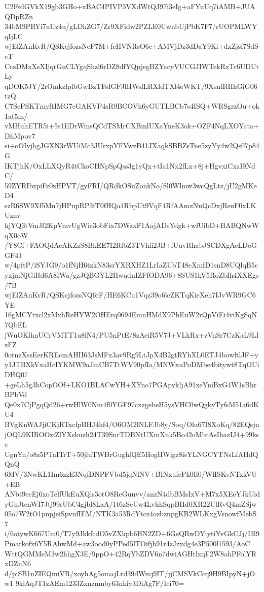 U2FsdGVkX19gb3GHo+xBAC4PIVP3VXdWtQJ97i3eIg+aFYuUq7iAMB+JUAQDpRZn
34bM9PRYi7uUz4u/gLDkZG7/Zr9XFidw2PZLE0UwnbUjPbK7F7/rUOPMLWYqIjLC
wjElZAnKvR/QSKcjfozsNeP7M+fcHVNRsO6c+AMVjDz3dDaY9Ki+dxZjsf7SdScT
CczDMxXsXIjqrGnCLYgqShzl6rDZ8dfYQpjegBZYacyVUCGJIWTekRxTr6UDUtLy
qDOK5JY/2rOmkzlplbGwBzTFsIGFJlHWslLRXldTXl4eWKT/9XsnfRHhGiG06tzQ
C7ScPSKTmyftIMG7cGAKVP4sR9BCOVh6yGUTLBCb7s4ISQ+WRSgrzOu+ok1at5m/
vMHuhETR5i+5s1EDrWmsQCdTSMrCXBmlUXaYneK3ok+OZF4NqLXOYata+DhMpov7
si+oOIyjhgJGXN3rWUiMc3JUrxpYFVwzB41JXaqkSBBZsTne5zyYy4w2Qs07p84G
IKTjhK/OxLLXQyR4tCkoCHNpSpQss3g1yQx+tIa1Nx2fLx+8j+HgvxiCxaI9NdC/
59ZYRIbzpiFz0zHPVT/gyFRI/QRdkOSuZonkNo/8l0Wlmw3wcQgLtz/jU2gMKeD4
szR6SW9Xf5Mn7jHPupRP3fT0fHQa4RbpUt9VqF4RfAAmzNuQcDxjRsuF0xLKUznv
hjYQ3tVmJf2KpVmvUgWic3obFix7DWzxF1AajADsYdgk+wfUibD+BABQNwWqX0oW
/Y8Cf+FAOQdAcAKZzS8BkEE7I2RlbZ3TVhii2JB+fUuvRhabJSCDXgAeLDoGGF4J
w/4pftP/iSYJG9/o1fNjH6tzkN83srYXRXHZ1LrIaZUbT48eXmfD1snD8UQlqB5c
yxjmNjGiRd6A8IWa/gzJQBGYL2HwudnIZFfODA96+8SUS1kV5RoZbIh4XXEgs/7B
wjElZAnKvR/QSKcjfozsNQ6rF/HE6KCu1Vqz39o6lcZKTqKieXeh7IJvWR9GC6YE
16gMCYtxcl2xMxhReHYW2OHErq0694EmnHMdX9PhEuW2rQpViEi4viKgSqN7QbEL
jWuOKlhnUCrVMTT1u8lN4/PU5nPtE/8zAeiR5V7J+VLkRx+zVnSr7CzKaL9LIzFZ
0otnzXssEerKREcmAHII63JsMFx3av9Rg9LtJpX4B2gtRYhXL0ETJ4bowltlJF+y
y1JTBXkVxaHcIYKMW9aJmCB7TtWV90pfIa/MNWxuPoDMbe4bitywt8TqOUiDHQ07
+geLh5g3hCopOOf+LKO1BLACwYH+XYno7PGApykljA91xeYniBxG4W1sBhrBPbVd
Qe0x7CjPgqQd26+rwHlW0Nm4f0YGF97cxzgebeH5ysVHC0wQgkyTyfsM51a6dKU4
BVgKnWAJjiCKjRTxcfpBHJ4hf4/O6OM2lNLFJb8y/Soq/Olu67I8XoKq/82EQsjn
jOQL9KIROOziZlYXskuzh24T39SnrTDBNtUXmXuk5Bo42oMbtAsIbazIJ4+99kse
UgnYn/o8z5PTaITrT+50jluTWBrGughlQE5HogHWigz8isYLNGCYTNsLfAHdQQnQ
6MV/3NwKL1Im6zzE3NqfDNPFVbd5jqNlNV+BINxufcPk0Il0/WlISKvNTxkVU+EB
ANbt9ecEj6xoTelfUkEuXQls3otO8ReGuuvv/anzN4dbBMsIxV+M7x5XEeYJkUid
yGhJtenWI7Jtj99rUbC4gjbl8LaA/1t6zSeUw4LvhhSqpBHd0XR22UlRvQ4mZSjw
05o7W2tO1pnpjeiSpvnfIEM/NTK3a53RdYtcz4ozbznpgKB2WLKxgVsnowfMebS7
i/6otywK667Um0/T7y9JkkfcdO5vZXkpb6HN2ZD+6GeQRwDYiytiYvGkCJj/I3l9
Pmarkofx6Y5RAhwMd+aw3ood0yPPed5lTOifjh91r4zJzxdg4e3P500l1593/AoC
WttQGMMeM3w2hhgX3E/9ppO+42RqYbZDV6n7dwiAGHtlxqF2W8ahPFolYRxDZnN6
d/piSB1nZIEQmiVR/xoyhAg5omajLtd39dWmj9IT/jjCMSVkCcq9H9BIpyN+jOw1
9kiAqJT1zAEm1233Zxnzmnby63nkiy3DiAg7F/Ici70=
